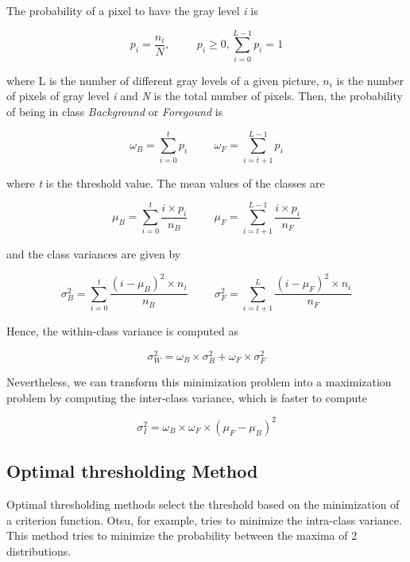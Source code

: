 \documentclass[12]{article}
\begin{document}
The probability of a pixel to have the gray level \textit{i} is
\vspace{-0.5cm}
\begin{center}
$$ p_i = \frac{n_i}{N}, \hspace{1cm} p_i \geqslant 0, \sum_{i = 0}^{L - 1} p_i = 1  $$
\end{center}
where L is the number of different gray levels of a given picture, $n_i$ is the number of pixels of gray level \textit{i} and \textit{N} is the total number of pixels. Then, the probability of being in class \textit{Background} or \textit{Foregound} is
\vspace{-0.5cm}
\begin{center}
$$ \omega_B = \sum_{i = 0}^{t} p_i \hspace{1cm} \omega_F = \sum_{i = t + 1}^{L - 1} p_i $$
\end{center}
where \textit{t} is the threshold value. The mean values of the classes are
\vspace{-0.5cm}
\begin{center}
$$ \mu_B = \sum_{i = 0}^{t} \frac{i \times p_i}{n_B} \hspace{1cm} \mu_F = \sum_{i = t + 1}^{L - 1} \frac{i \times p_i}{n_F} $$
\end{center}
and the class variances are given by
\vspace{-0.5cm}
\begin{center}
$$ \sigma_{B}^{2} = \sum_{i = 0}^{t} \frac{(i - \mu_B)^2 \times n_i}{n_B} \hspace{1cm} \sigma_{F}^{2} = \sum_{i = t + 1}^{L} \frac{(i - \mu_F)^2 \times n_i}{n_F} $$
\end{center}
Hence, the within-class variance is computed as
\vspace{-0.5cm}
\begin{center}
$$ \sigma_{W}^{2} = \omega_B \times \sigma_{B}^{2} + \omega_F \times \sigma_{F}^{2} $$
\end{center}
Nevertheless, we can transform this minimization problem into a maximization problem by computing the inter-class variance, which is faster to compute
\vspace{-0.5cm}
\begin{center}
$$ \sigma_{I}^{2} = \omega_B \times \omega_F \times (\mu_F - \mu_B)^2 $$
\end{center}

\subsection{Optimal thresholding Method}
Optimal thresholding methods select the threshold based on the minimization of a criterion function. Otsu, for example, tries to minimize the intra-class variance. This method tries to minimize the probability between the maxima of 2 distributions.
\end{document}
